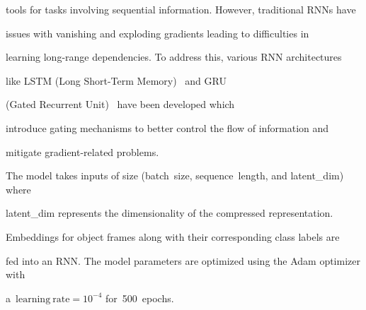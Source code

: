 tools for tasks involving sequential information. However, traditional RNNs have 

issues with vanishing and exploding gradients leading to difficulties in 

learning long-range dependencies. To address this, various RNN architectures 

like LSTM (Long Short-Term Memory)~\cite{10.1162/neco.1997.9.8.1735} and GRU 

(Gated Recurrent Unit)~\cite{cho2014learning} have been developed which 

introduce gating mechanisms to better control the flow of information and 

mitigate gradient-related problems.



The model takes inputs of size (batch~size, sequence~length, and latent\_dim) where 

latent\_dim represents the dimensionality of the compressed representation. 

Embeddings for object frames along with their corresponding class labels are 

fed into an RNN. The model parameters are optimized using the Adam optimizer with 

a~$\mathrm{learning~rate}=10^{-4}$ for~500~epochs.







